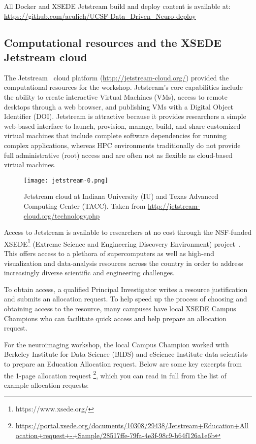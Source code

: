 All Docker and XSEDE Jetstream build and deploy content is available at:
\url{https://github.com/aculich/UCSF-Data_Driven_Neuro-deploy}

\subsection{Computational resources and the XSEDE Jetstream cloud}

The Jetstream~\cite{Stewart2015Jetstream} cloud platform
(\url{http://jetstream-cloud.org/}) provided the computational resources for the
workshop. Jetstream's core capabilities include the ability to create
interactive Virtual Machines (VMs), access to remote desktops through a web
browser, and publishing VMs with a Digital Object Identifier (DOI). Jetstream is
attractive because it provides researchers a simple web-based
interface\cite{NiravCyberinfra2016} to launch, provision, manage, build, and
share customized virtual machines that include complete software dependencies
for running complex applications, whereas HPC environments traditionally do not
provide full administrative (root) access and are often not as flexible as
cloud-based virtual machines.

\begin{figure}[h]
\centering
\texttt{[image: jetstream-0.png]}
\caption{Jetstream cloud at Indiana University (IU) and Texas Advanced Computing Center (TACC). Taken from \url{http://jetstream-cloud.org/technology.php}}
\end{figure}

Access to Jetstream is available to researchers at no cost through the
NSF-funded XSEDE\footnote{https://www.xsede.org/} (Extreme Science and
Engineering Discovery Environment) project~\cite{Towns2014XSEDE}. This
offers access to a plethora of supercomputers as well as high-end
visualization and data-analysis resources across the
country in order to address increasingly diverse scientific and
engineering challenges.

To obtain access, a qualified Principal Investigator writes a resource
justification and submits an allocation request. To help speed up the
process of choosing and obtaining access to the resource, many campuses
have local XSEDE Campus Champions who can facilitate quick access and
help prepare an allocation request.

For the neuroimaging workshop, the local Campus Champion worked with Berkeley
Institute for Data Science (BIDS) and eScience Institute data scientists to
prepare an Education Allocation request. Below are some key excerpts from the
1-page allocation request \footnote{\url{https://portal.xsede.org/documents/10308/29438/Jetstream+Education+Allocation+request+-+Sample/28517ffe-79fa-4e3f-98c9-b64f126a1e6b}},
which you can read in full from the list of example allocation requests:

